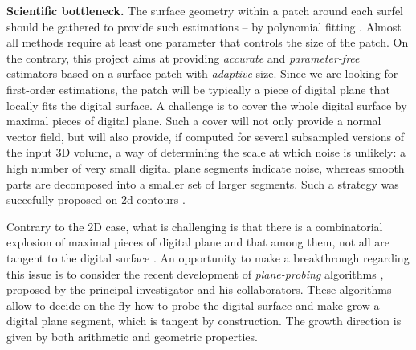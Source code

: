 \noindent\textbf{Scientific bottleneck.}
The surface geometry within a patch around each surfel should be gathered to provide such estimations
-- \eg by polynomial fitting \cite{Cazals2005,Cazals2008}.
Almost all methods require at least one parameter that controls the size of the patch.  
On the contrary, this project aims at providing \emph{accurate} and \emph{parameter-free} estimators
based on a surface patch with \emph{adaptive} size.
Since we are looking for first-order estimations, the patch will be typically a piece of digital plane
that locally fits the digital surface. %
A challenge is to cover the whole digital surface by maximal pieces of digital plane. 
Such a cover will not only provide a normal vector field, but will also provide, if computed
for several subsampled versions of the input 3D volume, a way of determining the scale 
at which noise is unlikely: a high number of very small digital plane segments indicate noise, whereas
smooth parts are decomposed into a smaller set of larger segments. Such a strategy was succefully proposed on 2d contours \cite{Kerautret2012}.

Contrary to the 2D case, what is challenging is that there is a combinatorial explosion
of maximal pieces of digital plane \cite{Sivignon2009} and that among them,
not all are tangent to the digital surface \cite{Charrier2011}.  
An opportunity to make a breakthrough regarding this issue is to consider the recent development
of \emph{plane-probing} algorithms \cite{LPRTCS2016, LPRDGCI2016, LPRJMIV2017},
proposed by the principal investigator and his collaborators.
These algorithms allow to decide
on-the-fly how to probe the digital surface and make grow a digital plane segment,
which is tangent by construction. The growth direction is given by both arithmetic and geometric properties.

